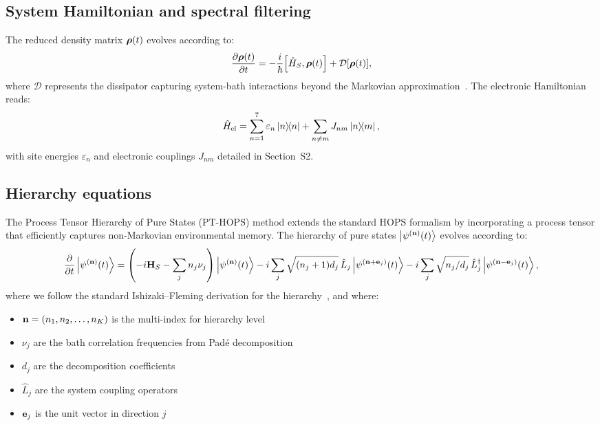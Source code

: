\documentclass[11pt,a4paper]{article}
\begin{document}
\subsection{System Hamiltonian and spectral filtering}
\label{sec:SI_pulse}

The reduced density matrix $\vb*{\rho}(t)$ evolves according to:
\begin{equation}
\pdv{\vb*{\rho}(t)}{t} = -\frac{i}{\hbar}\comm{\hat{H}_S}{\vb*{\rho}(t)} + \mathcal{D}[\vb*{\rho}(t)],
\label{eq:SI_master_eq}
\end{equation}
where $\mathcal{D}$ represents the dissipator capturing system-bath interactions beyond the Markovian approximation~\cite{Tanimura1989}. The electronic Hamiltonian reads:
\begin{equation}
\hat{H}_{\mathrm{el}} = \sum_{n=1}^{7} \varepsilon_n \dyad{n} + \sum_{n \neq m} J_{nm} \dyad{n}{m},
\label{eq:SI_excitonic_hamiltonian}
\end{equation}
with site energies $\varepsilon_n$ and electronic couplings $J_{nm}$ detailed in Section~S2.

\subsection{Hierarchy equations}

The Process Tensor Hierarchy of Pure States (PT-HOPS) method extends the standard HOPS formalism by incorporating a process tensor that efficiently captures non-Markovian environmental memory. The hierarchy of pure states $\ket{\psi^{(\vb{n})}(t)}$ evolves according to:
\begin{equation}
\pdv{t}\ket{\psi^{(\vb{n})}(t)} = \left(-i\vb{H}_S - \sum_{j} n_j \nu_j\right)\ket{\psi^{(\vb{n})}(t)} 
- i\sum_{j} \sqrt{(n_j+1)d_j} \, \hat{L}_j \ket{\psi^{(\vb{n}+\vb{e}_j)}(t)} 
- i\sum_{j} \sqrt{n_j/d_j} \, \hat{L}_j^\dagger \ket{\psi^{(\vb{n}-\vb{e}_j)}(t)},
\label{eq:SI_hops}
\end{equation}
where we follow the standard Ishizaki--Fleming derivation for the hierarchy~\cite{Ishizaki2009a,Strathearn2018}, and where:
\begin{itemize}
\item $\vb{n} = (n_1, n_2, \ldots, n_K)$ is the multi-index for hierarchy level
\item $\nu_j$ are the bath correlation frequencies from Padé decomposition
\item $d_j$ are the decomposition coefficients
\item $\hat{L}_j$ are the system coupling operators
\item $\vb{e}_j$ is the unit vector in direction $j$
\end{itemize}
\end{document}
